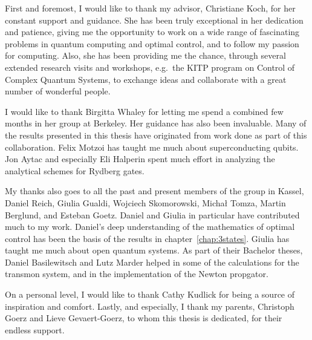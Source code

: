 
First and foremost, I would like to thank my advisor, Christiane Koch, for her
constant support and guidance. She has been truly exceptional in her dedication
and patience, giving me the opportunity to work on a wide range of fascinating
problems in quantum computing and optimal control, and to follow my passion for
computing. Also, she has been providing me the chance, through
several extended research visits and workshops, e.g.\ the KITP program on
Control of Complex Quantum Systems, to exchange ideas and collaborate
with a great number of wonderful people.

I would like to thank Birgitta Whaley for letting me spend a combined
few months in her group at Berkeley. Her guidance has also been
invaluable. Many of the results presented in
this thesis have originated from work done as part of this collaboration.
Felix Motzoi has taught me much about superconducting qubits.
Jon Aytac and especially Eli Halperin spent much effort in analyzing the
analytical schemes for Rydberg gates.

My thanks also goes to all the past and present members of the group in Kassel,
Daniel Reich, Giulia Gualdi, Wojciech Skomorowski, Michał Tomza, Martin
Berglund, and Esteban Goetz. Daniel and Giulia in particular have contributed
much to my work. Daniel's deep understanding of the mathematics of optimal
control has been the basis of the results in chapter~\ref{chap:3states}.
Giulia has taught me much about open quantum systems.
As part of their Bachelor theses, Daniel Basilewitsch and Lutz Marder helped in
some of the calculations for the transmon system, and in the implementation of
the Newton propgator.

On a personal level, I would like to thank Cathy Kudlick for being a source of
inspiration and comfort. Lastly, and especially, I thank my parents, Christoph
Goerz and Lieve Gevaert-Goerz, to whom this thesis is dedicated, for their
endless support.
